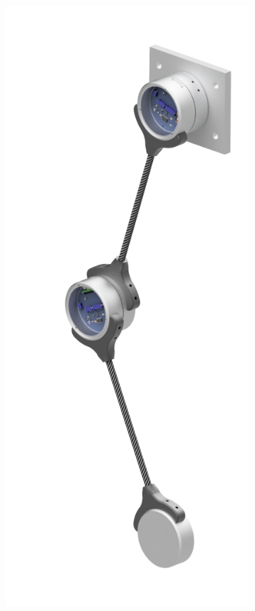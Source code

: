 \begin{figure}[H]
	\begin{minipage}{.45\linewidth}
		\begin{subfigure}[b]{\linewidth}
			\centering
			\includegraphics[width=.85\linewidth]{graphics/pendulum_assembly}

\end{subfigure}
\end{minipage}
\end{figure}
